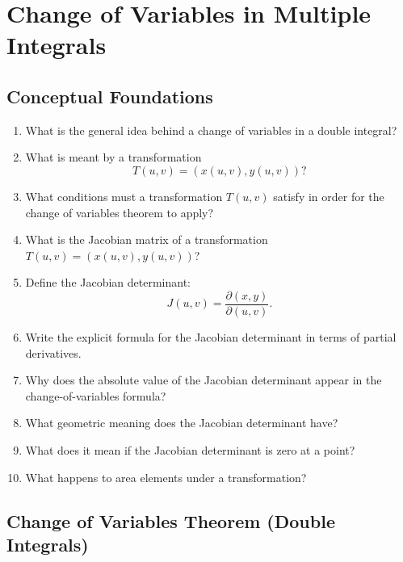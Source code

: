 \section{Change of Variables in Multiple Integrals}

\subsection{Conceptual Foundations}

\begin{enumerate}

\item What is the general idea behind a change of variables in a double integral?

\item What is meant by a transformation
  \[
    T(u,v) = (x(u,v), y(u,v))?
  \]

\item What conditions must a transformation $T(u,v)$ satisfy in order for the change of variables theorem to apply?

\item What is the Jacobian matrix of a transformation $T(u,v) = (x(u,v), y(u,v))$?

\item Define the Jacobian determinant:
  \[
    J(u,v) = \frac{\partial(x,y)}{\partial(u,v)}.
  \]

\item Write the explicit formula for the Jacobian determinant in terms of partial derivatives.

\item Why does the absolute value of the Jacobian determinant appear in the change-of-variables formula?

\item What geometric meaning does the Jacobian determinant have?

\item What does it mean if the Jacobian determinant is zero at a point?

\item What happens to area elements under a transformation?

\end{enumerate}

\subsection{Change of Variables Theorem (Double Integrals)}

